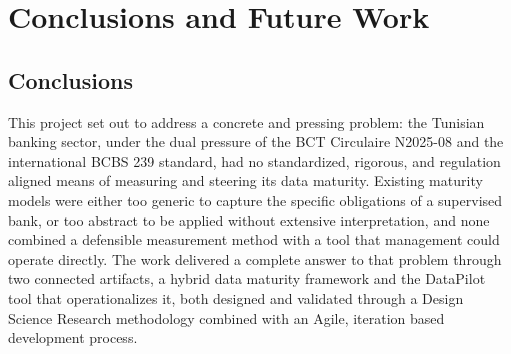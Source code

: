 
\section{Conclusions and Future Work}

\subsection{Conclusions}

This project set out to address a concrete and pressing problem: the Tunisian banking sector, under the dual pressure of the BCT Circulaire N\textdegree{}2025-08 and the international BCBS 239 standard, had no standardized, rigorous, and regulation aligned means of measuring and steering its data maturity. Existing maturity models were either too generic to capture the specific obligations of a supervised bank, or too abstract to be applied without extensive interpretation, and none combined a defensible measurement method with a tool that management could operate directly. The work delivered a complete answer to that problem through two connected artifacts, a hybrid data maturity framework and the DataPilot tool that operationalizes it, both designed and validated through a Design Science Research methodology combined with an Agile, iteration based development process.

